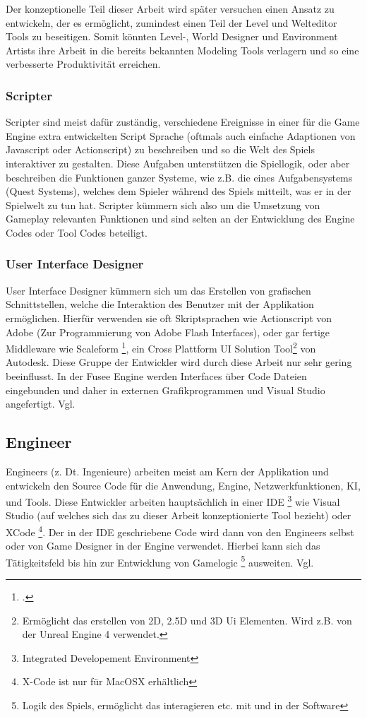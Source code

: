 \documentclass[pagesize, paper=a4, fontsize=12pt, titlepage=true, headings=small, headnosepline, abstractoff, liststotoc, nochapterprefix, plainheadsepline, twoside]{scrreprt}
\begin{document}
Der konzeptionelle Teil dieser Arbeit wird später versuchen einen Ansatz zu entwickeln, der es ermöglicht, zumindest einen Teil der Level und Welteditor Tools zu beseitigen. Somit könnten Level-, World Designer und Environment Artists ihre Arbeit in die bereits bekannten Modeling Tools verlagern und so eine verbesserte Produktivität erreichen.

\subsubsection{Scripter}
Scripter sind meist dafür zuständig, verschiedene Ereignisse in einer für die Game Engine extra entwickelten Script Sprache (oftmals auch einfache Adaptionen von Javascript oder Actionscript) zu beschreiben und so die Welt des Spiels interaktiver zu gestalten. Diese Aufgaben unterstützen die Spiellogik, oder aber beschreiben die Funktionen ganzer Systeme, wie z.B. die eines Aufgabensystems (Quest Systems), welches dem Spieler während des Spiels mitteilt, was er in der Spielwelt zu tun hat. Scripter kümmern sich also um die Umsetzung von Gameplay relevanten Funktionen und sind selten an der Entwicklung des Engine Codes oder Tool Codes beteiligt.

\subsubsection{User Interface Designer}
User Interface Designer kümmern sich um das Erstellen von grafischen Schnittstellen, welche die Interaktion des Benutzer mit der Applikation ermöglichen. Hierfür verwenden sie oft Skriptsprachen wie Actionscript von Adobe (Zur Programmierung von Adobe Flash Interfaces), oder gar fertige Middleware wie Scaleform \footcite{AutodeskScale2014}, ein Cross Plattform UI Solution Tool\footnote{Ermöglicht das erstellen von 2D, 2.5D und 3D Ui Elementen. Wird z.B. von der Unreal Engine 4 verwendet.} von Autodesk. Diese Gruppe der Entwickler wird durch diese Arbeit nur sehr gering beeinflusst. In der Fusee Engine werden Interfaces über Code Dateien eingebunden und daher in externen Grafikprogrammen und Visual Studio angefertigt. Vgl. \parencite[S. 31]{Chandler2006}

\subsection{Engineer}
Engineers (z. Dt. Ingenieure) arbeiten meist am Kern der Applikation und entwickeln den Source Code für die Anwendung, Engine, Netzwerkfunktionen, KI, und Tools. Diese Entwickler arbeiten hauptsächlich in einer IDE \footnote{Integrated Developement Environment} wie Visual Studio (auf welches sich das zu dieser Arbeit konzeptionierte Tool bezieht) oder XCode \footnote{X-Code ist nur für MacOSX erhältlich}. Der in der IDE geschriebene Code wird dann von den Engineers selbst oder von Game Designer in der Engine verwendet. Hierbei kann sich das Tätigkeitsfeld bis hin zur Entwicklung von Gamelogic \footnote{Logik des Spiels, ermöglicht das interagieren etc. mit und in der Software} ausweiten. Vgl. \parencite[S. 26]{Chandler2006}
\end{document}
